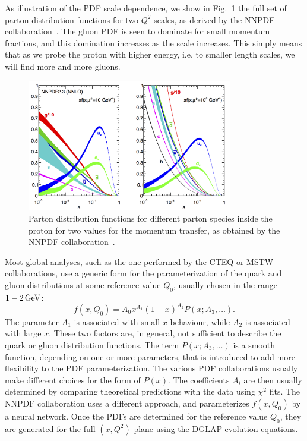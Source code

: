 As illustration of the PDF scale dependence, we show in Fig.~\ref{fig:NNPDF} the full
set of parton distribution functions for two $Q^2$ scales, as derived by the \textsc{NNPDF}
collaboration~\cite{Ball:2012cx}. 
The gluon PDF is seen to dominate for small momentum fractions, and this domination increases as the
scale increases. This simply means that as we probe the proton with higher energy, i.e. to smaller
length scales, we will find more and more gluons. 

\begin{figure}[tpb]
  \centering
  \includegraphics[width=0.8\textwidth]{figures/eventreco_event/nnpdf23_nnlo_allpdfs}
  \caption{Parton distribution functions for different parton species inside the proton for two
values for the momentum transfer, as obtained by the \textsc{NNPDF}
collaboration~\cite{NNPDF_website,Ball:2012cx}. 
  \label{fig:NNPDF}}
\end{figure}

Most global analyses, such as the one performed by the \textsc{CTEQ} or \textsc{MSTW}
collaborations, use a generic form for the parameterization of the quark and gluon distributions at
some reference value $Q_0$, usually chosen in the range $1-2\,\text{Ge\hspace{-.08em}V}$:
\begin{equation}
  f(x,Q_0) = A_0 x^{A_1} (1-x)^{A_2} P(x; A_3, \ldots) .
\end{equation}
The parameter $A_1$ is associated with small-$x$ behaviour, while $A_2$ is associated with
large $x$. These two factors are, in general, not sufficient to describe the quark or gluon
distribution functions. The term $P(x; A_3, \ldots)$ is a smooth function, depending on one or more
parameters, that is introduced to add more flexibility to the PDF parameterization. The various PDF
collaborations usually make different choices for the form of $P(x)$. 
The coefficients $A_i$ are then usually determined by comparing theoretical predictions with the
data using $\chi^2$ fits. 
The \textsc{NNPDF} collaboration uses a different approach, and parameterizes $f(x,Q_0)$ by a
neural network. 
Once the PDFs are determined for the reference value $Q_0$, they are generated for the full
$(x,Q^2)$ plane using the DGLAP evolution equations. 

